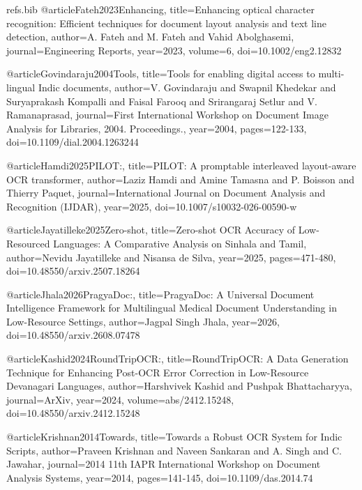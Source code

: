 \begin{filecontents}{refs.bib}
    @article{Fateh2023Enhancing,
    title={Enhancing optical character recognition: Efficient techniques for document layout analysis and text line detection},
    author={A. Fateh and M. Fateh and Vahid Abolghasemi},
    journal={Engineering Reports},
    year={2023},
    volume={6},
    doi={10.1002/eng2.12832}
    }
    
    @article{Govindaraju2004Tools,
    title={Tools for enabling digital access to multi-lingual Indic documents},
    author={V. Govindaraju and Swapnil Khedekar and Suryaprakash Kompalli and Faisal Farooq and Srirangaraj Setlur and V. Ramanaprasad},
    journal={First International Workshop on Document Image Analysis for Libraries, 2004. Proceedings.},
    year={2004},
    pages={122-133},
    doi={10.1109/dial.2004.1263244}
    }
    
    @article{Hamdi2025PILOT:,
    title={PILOT: A promptable interleaved layout-aware OCR transformer},
    author={Laziz Hamdi and Amine Tamasna and P. Boisson and Thierry Paquet},
    journal={International Journal on Document Analysis and Recognition (IJDAR)},
    year={2025},
    doi={10.1007/s10032-026-00590-w}
    }
    
    @article{Jayatilleke2025Zero-shot,
    title={Zero-shot OCR Accuracy of Low-Resourced Languages: A Comparative Analysis on Sinhala and Tamil},
    author={Nevidu Jayatilleke and Nisansa de Silva},
    year={2025},
    pages={471-480},
    doi={10.48550/arxiv.2507.18264}
    }
    
    @article{Jhala2026PragyaDoc:,
    title={PragyaDoc: A Universal Document Intelligence Framework for Multilingual Medical Document Understanding in Low-Resource Settings},
    author={Jagpal Singh Jhala},
    year={2026},
    doi={10.48550/arxiv.2608.07478}
    }
    
    @article{Kashid2024RoundTripOCR:,
    title={RoundTripOCR: A Data Generation Technique for Enhancing Post-OCR Error Correction in Low-Resource Devanagari Languages},
    author={Harshvivek Kashid and Pushpak Bhattacharyya},
    journal={ArXiv},
    year={2024},
    volume={abs/2412.15248},
    doi={10.48550/arxiv.2412.15248}
    }
    
    @article{Krishnan2014Towards,
    title={Towards a Robust OCR System for Indic Scripts},
    author={Praveen Krishnan and Naveen Sankaran and A. Singh and C. Jawahar},
    journal={2014 11th IAPR International Workshop on Document Analysis Systems},
    year={2014},
    pages={141-145},
    doi={10.1109/das.2014.74}
    }
    

\end{filecontents}
